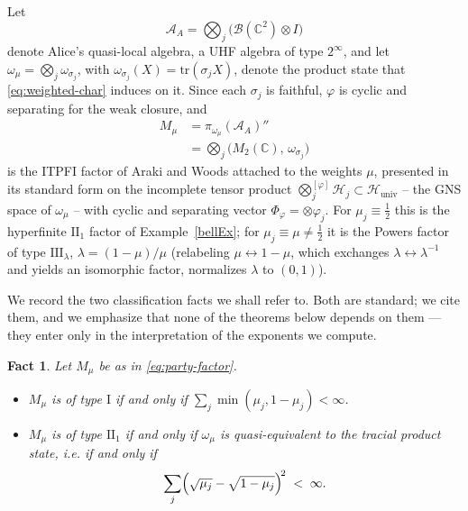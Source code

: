 \documentclass[twoside,11pt,letter]{article}
\def\bC{\mathbb{C}}
\def\cA{\mathcal{A}}
\def\cB{{\mathcal{B}}}
\def\cH{{\mathcal{H}}}
\newcommand{\tr}{\mathrm{tr}}
\newtheorem{fact}[theorem]{Fact}
\theoremstyle{definition}
\theoremstyle{definition}
\theoremstyle{plain}
\begin{document}
Let
\begin{equation}
\label{eq:alice-algebra}
\cA_A = \bigotimes_j \bigl( \cB(\bC^2) \otimes I \bigr)
\end{equation}
denote Alice's quasi-local algebra, a UHF algebra of type $2^\infty$, and let $\omega_\mu = \bigotimes_j \omega_{\sigma_j}$, with $\omega_{\sigma_j}(X) = \tr(\sigma_j X)$, denote the product state that \eqref{eq:weighted-char} induces on it. Since each $\sigma_j$ is faithful, $\varphi$ is cyclic and separating for the weak closure, and
\begin{equation}
\label{eq:party-factor}
\begin{split}
M_\mu &= \pi_{\omega_\mu}(\cA_A)''\\
&= \bigotimes_j \bigl( M_2(\bC),\, \omega_{\sigma_j} \bigr)
\end{split}
\end{equation}
is the ITPFI factor of Araki and Woods \cite{AW68} attached to the weights $\mu$, presented in its standard form on the incomplete tensor product $\bigotimes^{[\varphi]}_j \cH_j \subset \cH_{\mathrm{univ}}$ -- the GNS space of $\omega_\mu$ -- with cyclic and separating vector $\Phi_\varphi = \otimes \varphi_j$. For $\mu_j \equiv \tfrac12$ this is the hyperfinite $\mathrm{II}_1$ factor of Example~\ref{bellEx}; for $\mu_j \equiv \mu \neq \tfrac12$ it is the Powers factor of
type $\mathrm{III}_\lambda$, $\lambda = (1-\mu)/\mu$ \cite{P67} (relabeling $\mu \leftrightarrow 1-\mu$, which exchanges $\lambda \leftrightarrow \lambda^{-1}$ and yields an isomorphic factor, normalizes $\lambda$ to $(0,1)$).

We record the two classification facts we shall refer to. Both are standard; we cite them, and we emphasize that none of the theorems below depends on them --- they enter only in the interpretation of the exponents we compute.

\begin{fact}
\label{fact:AW}
Let $M_\mu$ be as in \eqref{eq:party-factor}.
\begin{itemize}
\item[(i)] $M_\mu$ is of type $\mathrm{I}$ if and only if $\sum_j \min(\mu_j, 1-\mu_j) < \infty$.
\item[(ii)] $M_\mu$ is of type $\mathrm{II}_1$ if and only if $\omega_\mu$ is quasi-equivalent to the tracial product state, i.e. if and
only if
\begin{equation}
\label{eq:II1-series}
\sum_j \Bigl( \sqrt{\mu_j} - \sqrt{1-\mu_j} \Bigr)^{\!2} \;<\; \infty .
\end{equation}
\end{itemize}
\end{fact}
\end{document}
